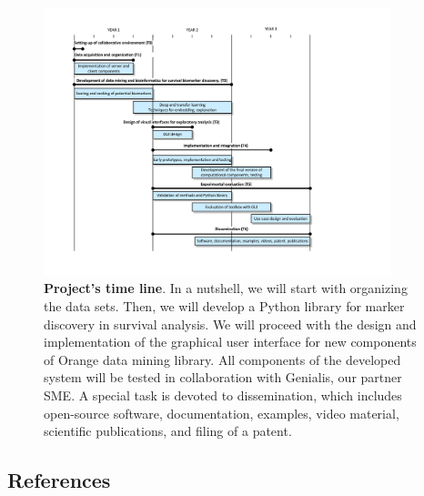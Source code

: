 \documentclass[11pt,a4paper]{article}
\renewcommand{\bold}{\textbf}
\begin{document}
\begin{figure}
\includegraphics[width=0.90\textwidth]{gantt}
\caption{\bold{Project's time line}. In a nutshell, we will start with organizing the data sets. Then, we will develop a Python library for marker discovery in survival analysis. We will proceed with the design and implementation of the graphical user interface for new components of Orange data mining library. All components of the developed system will be tested in collaboration with Genialis, our partner SME. A special task is devoted to dissemination, which includes open-source software, documentation, examples, video material, scientific publications, and filing of a patent.}
\label{fig:gantt}
\end{figure}



\clearpage
\subsection*{References}


\begin{multicols}{2}
\footnotesize
\setlength{\parskip}{0em}
\renewcommand{\baselinestretch}{1.0}


\end{multicols}
\end{document}
